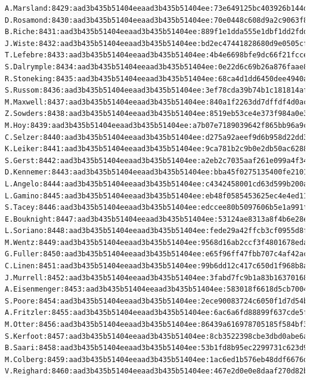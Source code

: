 \documentclass[12pt,a4paper]{article}
\begin{document}
\begin{appendices}
\begin{lstlisting}
A.Marsland:8429:aad3b435b51404eeaad3b435b51404ee:73e649125bc403926b144d55afb39b93:::
D.Rosamond:8430:aad3b435b51404eeaad3b435b51404ee:70e0448c608d9a2c9063f843a67e19ea:::
B.Riche:8431:aad3b435b51404eeaad3b435b51404ee:889f1e1dda555e1dbf1dd2fddeab883d:::
J.Wiste:8432:aad3b435b51404eeaad3b435b51404ee:bd2ec47441828680d9e0505cf0459e5c:::
T.Lefebre:8433:aad3b435b51404eeaad3b435b51404ee:4b4e6698bfe9dc66f21fccee2b3a716f:::
S.Dalrymple:8434:aad3b435b51404eeaad3b435b51404ee:0e22d6c69b26a876faae86c723e905fc:::
R.Stoneking:8435:aad3b435b51404eeaad3b435b51404ee:68ca4d1dd6450dee4940a9bcb4ce8423:::
S.Russom:8436:aad3b435b51404eeaad3b435b51404ee:3ef78cda39b74b1c181814af284fb3f1:::
M.Maxwell:8437:aad3b435b51404eeaad3b435b51404ee:840a1f2263dd7dffdf4d0ac22dcc6f49:::
Z.Sowders:8438:aad3b435b51404eeaad3b435b51404ee:8519eb53ce4e373f984a0e38f4b810fb:::
M.Hoy:8439:aad3b435b51404eeaad3b435b51404ee:a7b07e7189039642f865bb96a9c35570:::
C.Selzer:8440:aad3b435b51404eeaad3b435b51404ee:d275a92aeef9d6b958d22dd34e2d33cb:::
K.Leiker:8441:aad3b435b51404eeaad3b435b51404ee:9ca781b2c9b0e2db50ac628846f852f5:::
S.Gerst:8442:aad3b435b51404eeaad3b435b51404ee:a2eb2c7035aaf261e099a4f345f14980:::
D.Kennemer:8443:aad3b435b51404eeaad3b435b51404ee:bba45f0275135400fe21015d52d937b1:::
L.Angelo:8444:aad3b435b51404eeaad3b435b51404ee:c4342458001cd63d599b200ad74cb09e:::
L.Gamino:8445:aad3b435b51404eeaad3b435b51404ee:eb48f0585453625ec4e4ed116977042e:::
S.Tacey:8446:aad3b435b51404eeaad3b435b51404ee:edccee80b5097606b5e1a991ff20d0ab:::
E.Bouknight:8447:aad3b435b51404eeaad3b435b51404ee:53124ae8313a8f4b6e28eec9b978e41c:::
L.Soriano:8448:aad3b435b51404eeaad3b435b51404ee:fede29a42ffcb3cf0955d8f7ca567955:::
M.Wentz:8449:aad3b435b51404eeaad3b435b51404ee:9568d16ab2ccf3f4801678eda8bc749d:::
G.Fuller:8450:aad3b435b51404eeaad3b435b51404ee:e65f96ff47fbb707c4af42aced95d43b:::
C.Linen:8451:aad3b435b51404eeaad3b435b51404ee:99b6dd12c417c650d1f968b8afdde36e:::
J.Murrell:8452:aad3b435b51404eeaad3b435b51404ee:3fabd7fc9b1a83b16370168f7fbc741e:::
A.Eisenmenger:8453:aad3b435b51404eeaad3b435b51404ee:583018f6618d5cb7004b6af75eadf510:::
S.Poore:8454:aad3b435b51404eeaad3b435b51404ee:2ece90083724c6050f1d7d54b57c13e0:::
A.Fritzler:8455:aad3b435b51404eeaad3b435b51404ee:6ac6a6fd88899f637cde5f2e6564a1e1:::
M.Otter:8456:aad3b435b51404eeaad3b435b51404ee:86439a616978705185f584bf350cf5dc:::
S.Kerfoot:8457:aad3b435b51404eeaad3b435b51404ee:8cb3522398cbe3dbd0abe6a26a87478e:::
B.Saari:8458:aad3b435b51404eeaad3b435b51404ee:53b1fd8b95ec2299731c623d948276c6:::
M.Colberg:8459:aad3b435b51404eeaad3b435b51404ee:1ac6ed1b576eb48ddf6676d0bb2aa3e5:::
V.Reighard:8460:aad3b435b51404eeaad3b435b51404ee:467e2d0e0e8daaf270d82b9dcc7124c6:::

\end{lstlisting}
\end{appendices}
\end{document}
